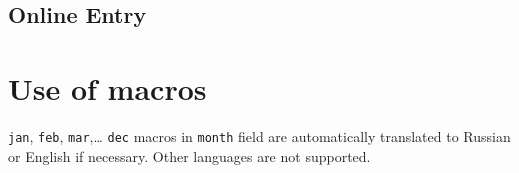 \documentclass[a4paper]{article}
\begin{document}
\subsection{Online Entry}

\section{Use of macros}

\texttt{jan}, \texttt{feb}, \texttt{mar},\ldots{} \texttt{dec} macros in \texttt{month} field
are automatically translated to Russian or English if necessary. Other languages are not supported.
\end{document}
